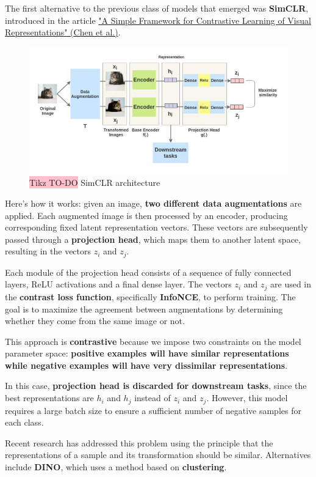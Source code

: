 The first alternative to the previous class of models that emerged was \textbf{SimCLR}, introduced in the article \href{https://arxiv.org/pdf/2002.05709}{"A Simple Framework for Contrastive Learning of Visual Representations" (Chen et al.)}.

\begin{figure}[!htbp]
    \centering
    \includegraphics[width=0.75\linewidth]{tikz/chapter11 - SimCLR.png}
    \caption{{\color{red}\colorbox{pink}{Tikz TO-DO}} SimCLR architecture}
\end{figure}

Here's how it works: given an image, \textbf{two different data augmentations} are applied. Each augmented image is then processed by an encoder, producing corresponding fixed latent representation vectors. These vectors are subsequently passed through a \textbf{projection head}, which maps them to another latent space, resulting in the vectors $z_i$ and $z_j$.

Each module of the projection head consists of a sequence of fully connected layers, ReLU activations and a final dense layer. The vectors $z_i$ and $z_j$ are used in the \textbf{contrast loss function}, specifically \textbf{InfoNCE}, to perform training. The goal is to maximize the agreement between augmentations by determining whether they come from the same image or not.

This approach is \textbf{contrastive} because we impose two constraints on the model parameter space: \textbf{positive examples will have similar representations while negative examples will have very dissimilar representations}.

In this case, \textbf{projection head is discarded for downstream tasks}, since the best representations are $h_i$ and $h_j$ instead of $z_i$ and $z_j$. However, this model requires a large batch size to ensure a sufficient number of negative samples for each class.

Recent research has addressed this problem using the principle that the representations of a sample and its transformation should be similar. Alternatives include \textbf{DINO}, which uses a method based on \textbf{clustering}.

